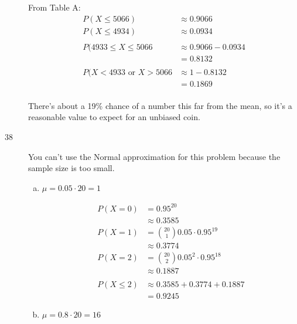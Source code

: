 \documentclass[letterpaper, landscape]{exam}
\begin{document}
\begin{description}
        From Table A:
        \begin{align*}
          P(X \leq 5066) & \approx 0.9066 \\
          P(X \leq 4934) & \approx 0.0934 \\
          \\
          P(4933 \leq X \leq 5066 & \approx 0.9066 - 0.0934 \\
                                  & =0.8132 \\
          \\
          P(X < 4933 \text{ or } X > 5066 & \approx 1 - 0.8132 \\
                                          & = 0.1869 \\
        \end{align*}

        There's about a 19\% chance of a number this far from the mean, so it's
        a reasonable value to expect for an unbiased coin.

      \item[38]
        You can't use the Normal approximation for this problem because the
        sample size is too small.

        \begin{enumerate}[(a)]
          \item 
            $\mu = 0.05 \cdot 20 = \boxed{ 1 }$

            \begin{align*}
              P(X = 0) & = 0.95^{20} \\
                       & \approx 0.3585 \\
              P(X = 1) & = \binom{20}{1} 0.05 \cdot 0.95^{19} \\
                       & \approx 0.3774 \\
              P(X = 2) & = \binom{20}{2} 0.05^2 \cdot 0.95^{18} \\
                       & \approx 0.1887 \\
                       \\
              P(X \leq 2) & \approx 0.3585 + 0.3774 + 0.1887 \\
                          & = \boxed{ 0.9245 }
            \end{align*}

          \item 
            $\mu = 0.8 \cdot 20 = \boxed{ 16 }$


\end{enumerate}
\end{description}
\end{document}
